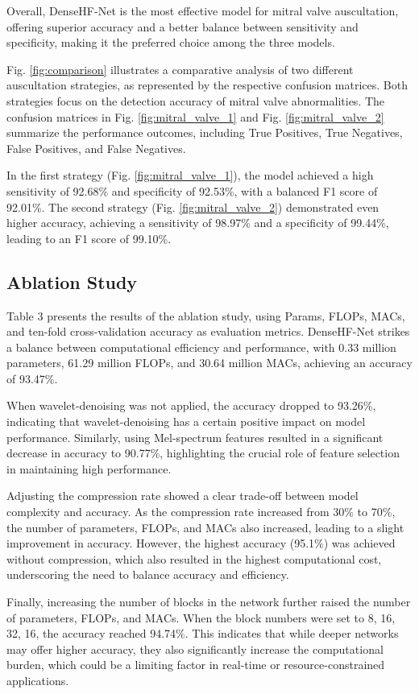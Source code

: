 Overall, DenseHF-Net is the most effective model for mitral valve auscultation, offering superior accuracy and a better balance between sensitivity and specificity, making it the preferred choice among the three models.

Fig. \ref{fig:comparison} illustrates a comparative analysis of two different auscultation strategies, as represented by the respective confusion matrices. Both strategies focus on the detection accuracy of mitral valve abnormalities. The confusion matrices in Fig. \ref{fig:mitral_valve_1} and Fig. \ref{fig:mitral_valve_2} summarize the performance outcomes, including True Positives, True Negatives, False Positives, and False Negatives.

In the first strategy (Fig. \ref{fig:mitral_valve_1}), the model achieved a high sensitivity of 92.68\% and specificity of 92.53\%, with a balanced F1 score of 92.01\%. The second strategy (Fig. \ref{fig:mitral_valve_2}) demonstrated even higher accuracy, achieving a sensitivity of 98.97\% and a specificity of 99.44\%, leading to an F1 score of 99.10\%.

\subsection{Ablation Study}
Table 3 presents the results of the ablation study, using Params, FLOPs, MACs, and ten-fold cross-validation accuracy as evaluation metrics. 
DenseHF-Net strikes a balance between computational efficiency and performance, with 0.33 million parameters, 61.29 million FLOPs, and 30.64 million MACs, achieving an accuracy of 93.47\%.

When wavelet-denoising was not applied, the accuracy dropped to 93.26\%, indicating that wavelet-denoising has a certain positive impact on model performance. Similarly, using Mel-spectrum features resulted in a significant decrease in accuracy to 90.77\%, highlighting the crucial role of feature selection in maintaining high performance.

Adjusting the compression rate showed a clear trade-off between model complexity and accuracy. As the compression rate increased from 30\% to 70\%, the number of parameters, FLOPs, and MACs also increased, leading to a slight improvement in accuracy. However, the highest accuracy (95.1\%) was achieved without compression, which also resulted in the highest computational cost, underscoring the need to balance accuracy and efficiency.

Finally, increasing the number of blocks in the network further raised the number of parameters, FLOPs, and MACs. When the block numbers were set to 8, 16, 32, 16, the accuracy reached 94.74\%. This indicates that while deeper networks may offer higher accuracy, they also significantly increase the computational burden, which could be a limiting factor in real-time or resource-constrained applications.

